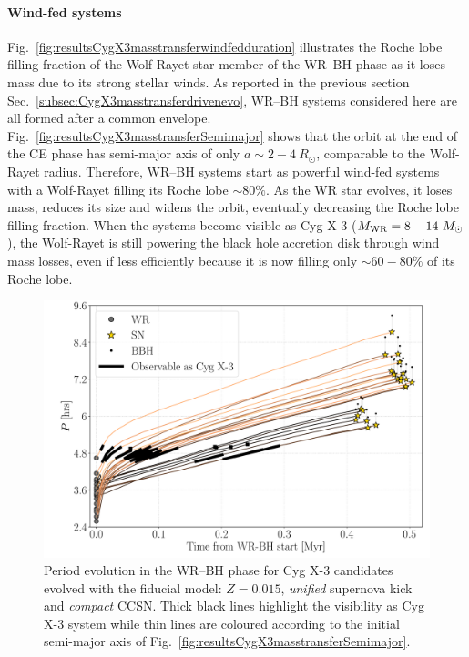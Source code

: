 \documentclass[a4paper,titlepage]{book}     	%
\newcommand{\sun}{\ensuremath{_\odot}}
\newcommand{\msun}{\ensuremath{M\sun}}
\newcommand{\rsun}{R_{\odot}}
\newcommand{\mwr}{\ensuremath{M_\textup{WR}}}
\begin{document}
\paragraph{Wind-fed systems} Fig.\ \ref{fig:resultsCygX3masstransferwindfedduration} illustrates the Roche lobe filling fraction of the Wolf-Rayet star member of the WR--BH phase as it loses mass due to its strong stellar winds. As reported in the previous section Sec.\ \ref{subsec:CygX3masstransferdrivenevo}, WR--BH systems considered here are all formed after a common envelope. Fig.\ \ref{fig:resultsCygX3masstransferSemimajor} shows that the orbit at the end of the CE phase has semi-major axis of only $a \sim 2-4~\rsun$, comparable to the Wolf-Rayet radius. Therefore, WR--BH systems start as powerful wind-fed systems with a Wolf-Rayet filling its Roche lobe $\sim 80\%$. As the WR star evolves, it loses mass, reduces its size and widens the orbit, eventually decreasing the Roche lobe filling fraction. When the systems become visible as Cyg X-3 ($\mwr = 8-14~\msun$), the Wolf-Rayet is still powering the black hole accretion disk through wind mass losses, even if less efficiently because it is now filling only $\sim 60-80\%$ of its Roche lobe. 







\newpage
\begin{figure}[t!]
	\centering
	\includegraphics[width=\textwidth]{./images/BWorldtime_Period_BHBH_GW_WRBH_cyg_x-3--Ko17.pdf}
	\caption{Period evolution in the WR--BH phase for Cyg X-3 candidates evolved with the fiducial model: $Z=0.015$, \emph{unified} supernova kick and \emph{compact} CCSN. Thick black lines highlight the visibility as Cyg X-3 system while thin lines are coloured according to the initial semi-major axis of Fig.\ \ref{fig:resultsCygX3masstransferSemimajor}.}\label{fig:resultsCygX3masstransferPeriod}
\end{figure}
\end{document}
